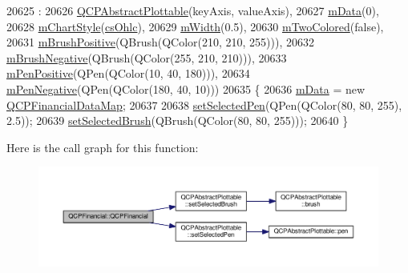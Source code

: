 \begin{DoxyCode}
20625                                                                :
20626   \hyperlink{class_q_c_p_abstract_plottable_af78a036e40db6f53a31abadc5323715a}{QCPAbstractPlottable}(keyAxis, valueAxis),
20627   \hyperlink{class_q_c_p_financial_a475f63587ca1077d8c30aaf2b71ae026}{mData}(0),
20628   \hyperlink{class_q_c_p_financial_ab65c2ce8d6354451870bb44b894c1e92}{mChartStyle}(\hyperlink{class_q_c_p_financial_a0f800e21ee98d646dfc6f8f89d10ebfba3a516016c9298d3e95dd82aa203c4390}{csOhlc}),
20629   \hyperlink{class_q_c_p_financial_af630e5eb8485146b9c777e63fd1cf993}{mWidth}(0.5),
20630   \hyperlink{class_q_c_p_financial_a6afe919190b884d9bac026cefcc8c0a8}{mTwoColored}(\textcolor{keyword}{false}),
20631   \hyperlink{class_q_c_p_financial_ab7e6eed16260a2f88ca6bd940dffea79}{mBrushPositive}(QBrush(QColor(210, 210, 255))),
20632   \hyperlink{class_q_c_p_financial_acb0e31874b7a1deb56bd42e8ab3e68f2}{mBrushNegative}(QBrush(QColor(255, 210, 210))),
20633   \hyperlink{class_q_c_p_financial_aa6599186f417ba615caebb3f6c762bd8}{mPenPositive}(QPen(QColor(10, 40, 180))),
20634   \hyperlink{class_q_c_p_financial_a263fbfefde2cc19c8d4024a8319c2bbb}{mPenNegative}(QPen(QColor(180, 40, 10)))
20635 \{
20636   \hyperlink{class_q_c_p_financial_a475f63587ca1077d8c30aaf2b71ae026}{mData} = \textcolor{keyword}{new} \hyperlink{qcustomplot_8h_a745c09823fae0974b50beca9bc3b3d7d}{QCPFinancialDataMap};
20637   
20638   \hyperlink{class_q_c_p_abstract_plottable_a6911603cad23ab0469b108224517516f}{setSelectedPen}(QPen(QColor(80, 80, 255), 2.5));
20639   \hyperlink{class_q_c_p_abstract_plottable_ae8c816874089f7a44001e8618e81a9dc}{setSelectedBrush}(QBrush(QColor(80, 80, 255)));
20640 \}
\end{DoxyCode}


Here is the call graph for this function\+:\nopagebreak
\begin{figure}[H]
\begin{center}
\leavevmode
\includegraphics[width=350pt]{class_q_c_p_financial_a4702d5248feeb9d1ec6e3ce725b10b32_cgraph}
\end{center}
\end{figure}


